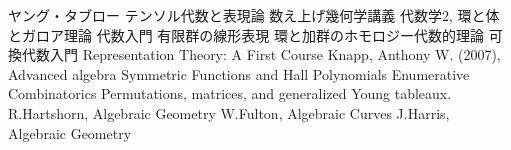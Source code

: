 \begin{thebibliography}{99}
   ヤング・タブロー
   テンソル代数と表現論
   数え上げ幾何学講義
   代数学2, 環と体とガロア理論
   代数入門
   有限群の線形表現
   環と加群のホモロジー代数的理論
   可換代数入門
   Representation Theory: A First Course
  Knapp, Anthony W. (2007), Advanced algebra
   Symmetric Functions and Hall Polynomials
   Enumerative Combinatorics
   Permutations, matrices, and generalized Young tableaux.
   R.Hartshorn, Algebraic Geometry
   W.Fulton, Algebraic Curves
   J.Harris, Algebraic Geometry
\end{thebibliography}